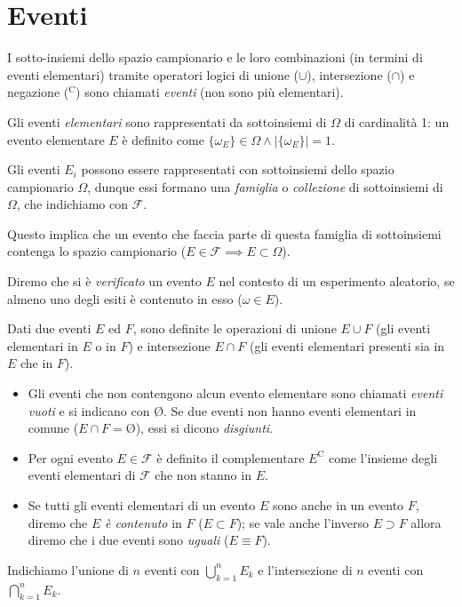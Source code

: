         \section{Eventi}\label{sec:Eventi}
        \begin{defn}
            I sotto-insiemi dello spazio campionario e le loro combinazioni (in termini di eventi elementari) tramite operatori logici di unione ($\cup$), intersezione ($\cap$) e negazione ($^{\text{C}}$) sono chiamati \emph{eventi} (non sono più elementari).
        \end{defn}
        \begin{obsv}
            Gli eventi \emph{elementari} sono rappresentati da sottoinsiemi di $\Omega$ di cardinalità 1: un evento elementare $E$ è definito come $\{\omega_E\} \in \Omega \land |\{\omega_E\}| = 1$.
        \end{obsv}
        \begin{defn}
            Gli eventi $E_i$ possono essere rappresentati con sottoinsiemi dello spazio campionario $\Omega$, dunque essi formano una \emph{famiglia} o \emph{collezione} di sottoinsiemi di $\Omega$, che indichiamo con $\mathscr{F}$.

            Questo implica che un evento che faccia parte di questa famiglia di sottoinsiemi contenga lo spazio campionario ($E \in \mathscr{F} \implies E \subset \Omega$).

            Diremo che si è \emph{verificato} un evento $E$ nel contesto di un esperimento aleatorio, se almeno uno degli esiti è contenuto in esso ($\omega \in E$).
        \end{defn}
        \begin{defn}
            Dati due eventi $E$ ed $F$, sono definite le operazioni di unione $E \cup F$ (gli eventi elementari in $E$ o in $F$) e intersezione $E \cap F$ (gli eventi elementari presenti sia in $E$ che in $F$).
            \begin{itemize}
                \item Gli eventi che non contengono alcun evento elementare sono chiamati \emph{eventi vuoti} e si indicano con \O. Se due eventi non hanno eventi elementari in comune ($E \cap F = \text{\O}$), essi si dicono \emph{disgiunti}.
                \item Per ogni evento $E \in \mathscr{F}$ è definito il complementare $E^{\text{C}}$ come l'insieme degli eventi elementari di $\mathscr{F}$ che non stanno in $E$.
                \item Se tutti gli eventi elementari di un evento $E$ sono anche in un evento  $F$, diremo che $E$ \emph{è contenuto} in  $F$ ($E \subset F$); se vale anche l'inverso $E \supset F$ allora diremo che i due eventi sono \emph{uguali} ($E \equiv F$).
            \end{itemize}
            Indichiamo l'unione di $n$ eventi con  $\bigcup_{k=1}^{n} E_k$ e l'intersezione di  $n$ eventi con $\bigcap_{k=1}^{n} E_k$.
        \end{defn}
